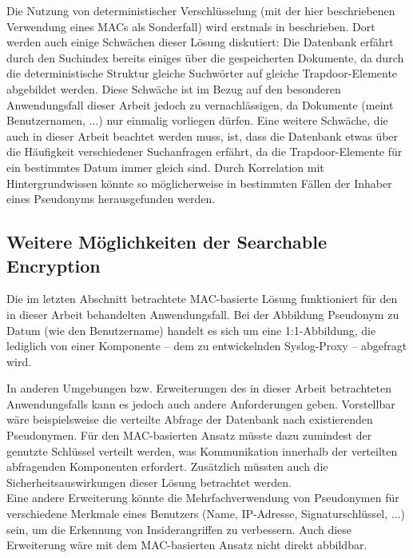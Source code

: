 Die Nutzung von deterministischer Verschlüsselung (mit der hier beschriebenen Verwendung eines MACs als Sonderfall) wird erstmals in \cite{bellare2007deterministic} beschrieben. Dort werden auch einige Schwächen dieser Lösung diskutiert: Die Datenbank erfährt durch den Suchindex bereits einiges über die gespeicherten Dokumente, da durch die deterministische Struktur gleiche Suchwörter auf gleiche Trapdoor-Elemente abgebildet werden. Diese Schwäche ist im Bezug auf den besonderen Anwendungsfall dieser Arbeit jedoch zu vernachlässigen, da Dokumente (meint Benutzernamen, ...) nur einmalig vorliegen dürfen. Eine weitere Schwäche, die auch in dieser Arbeit beachtet werden muss, ist, dass die Datenbank etwas über die Häufigkeit verschiedener Suchanfragen erfährt, da die Trapdoor-Elemente für ein bestimmtes Datum immer gleich sind. Durch Korrelation mit Hintergrundwissen könnte so möglicherweise in bestimmten Fällen der Inhaber eines Pseudonyms herausgefunden werden. 

\subsection{Weitere Möglichkeiten der Searchable Encryption}
\label{sec_state_se_furtherpossibilities}


Die im letzten Abschnitt betrachtete MAC-basierte Lösung funktioniert für den in dieser Arbeit behandelten Anwendungsfall. Bei der Abbildung Pseudonym zu Datum (wie den Benutzername) handelt es sich um eine 1:1-Abbildung, die lediglich von einer Komponente -- dem zu entwickelnden Syslog-Proxy  -- abgefragt wird. 

In anderen Umgebungen bzw. Erweiterungen des in dieser Arbeit betrachteten Anwendungsfalls kann es jedoch auch andere Anforderungen geben. Vorstellbar wäre beispielsweise die verteilte Abfrage der Datenbank nach existierenden Pseudonymen. Für den MAC-basierten Ansatz müsste dazu zumindest der genutzte Schlüssel verteilt werden, was Kommunikation innerhalb der verteilten abfragenden Komponenten erfordert. Zusätzlich müssten auch die Sicherheitsauswirkungen dieser Lösung betrachtet werden.\\
Eine andere Erweiterung könnte die Mehrfachverwendung von Pseudonymen für verschiedene Merkmale eines Benutzers (Name, IP-Adresse, Signaturschlüssel, ...) sein, um die Erkennung von Insiderangriffen zu verbessern. Auch diese Erweiterung wäre mit dem MAC-basierten Ansatz nicht direkt abbildbar.

